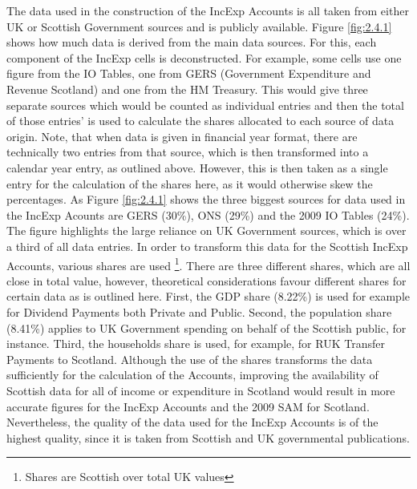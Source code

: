 The data used in the construction of the IncExp Accounts is all taken from either UK or Scottish Government sources and is publicly available. Figure \ref{fig:2.4.1} shows how much data is derived from the main data sources. For this, each component of the IncExp cells is deconstructed. For example, some cells use one figure from the IO Tables, one from GERS (Government Expenditure and Revenue Scotland) and one from the HM Treasury. This would give three separate sources which would be counted as individual entries and then the total of those entries' is used to calculate the shares allocated to each source of data origin. Note, that when data is given in financial year format, there are technically two entries from that source, which is then transformed into a calendar year entry, as outlined above. However, this is then taken as a single entry for the calculation of the shares here, as it would otherwise skew the percentages. As Figure \ref{fig:2.4.1} shows the three biggest sources for data used in the IncExp Acounts are GERS (30\%), ONS (29\%) and the 2009 IO Tables (24\%). The figure highlights the large reliance on UK Government sources, which is over a third of all data entries. In order to transform this data for the Scottish IncExp Accounts, various shares are used \footnote{Shares are Scottish over total UK values}. There are three different shares, which are all close in total value, however, theoretical considerations favour different shares for certain data as is outlined here. First, the GDP share (8.22\%) is used for example for Dividend Payments both Private and Public. Second, the population share (8.41\%) applies to UK Government spending on behalf of the Scottish public, for instance. Third, the households share is used, for example, for RUK Transfer Payments to Scotland. Although the use of the shares transforms the data sufficiently for the calculation of the Accounts, improving the availability of Scottish data for all of income or expenditure in Scotland would result in more accurate figures for the IncExp Accounts and the 2009 SAM for Scotland. Nevertheless, the quality of the data used for the IncExp Accounts is of the highest quality, since it is taken from Scottish and UK governmental publications. 

